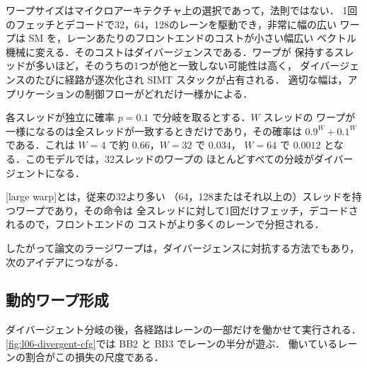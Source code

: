 \documentclass[../main.tex]{subfiles}
\begin{document}
ワープサイズはマイクロアーキテクチャ上の選択であって，法則ではない．
1回のフェッチとデコードで32，64，128のレーンを駆動でき，非常に幅の広い
ワープは SM を，レーンあたりのフロントエンドのコストが小さい幅広い
ベクトル機械に変える．そのコストはダイバージェンスである．ワープが
保持するスレッドが多いほど，そのうちの1つが他と一致しない可能性は高く，
ダイバージェンスのたびに経路が逐次化され SIMT スタックが占有される．
適切な幅は，アプリケーションの制御フローがどれだけ一様かによる．

\begin{example}
  \label{ex:l06-large-warp}
  各スレッドが独立に確率 $p = 0.1$ で分岐を取るとする．$W$ スレッドの
  ワープが一様になるのは全スレッドが一致するときだけであり，その確率は
  $0.9^W + 0.1^W$ である．これは $W = 4$ で約 $0.66$，$W = 32$ で $0.034$，
  $W = 64$ で $0.0012$ となる．このモデルでは，32スレッドのワープの
  ほとんどすべての分岐がダイバージェントになる．
\end{example}

\begin{definition}[ラージワープ]
  \label{def:l06-large-warp}
  [large warp]とは，従来の32より多い
  （64，128またはそれ以上の）スレッドを持つワープであり，その命令は
  全スレッドに対して1回だけフェッチ，デコードされるので，フロントエンドの
  コストがより多くのレーンで分担される．
\end{definition}

%
したがって論文のラージワープは，ダイバージェンスに対抗する方法でもあり，
次のアイデアにつながる．

\subsection{動的ワープ形成}

ダイバージェント分岐の後，各経路はレーンの一部だけを働かせて実行される．
\cref{fig:l06-divergent-cfg}では BB2 と BB3 でレーンの半分が遊ぶ．
働いているレーンの割合がこの損失の尺度である．
\end{document}
